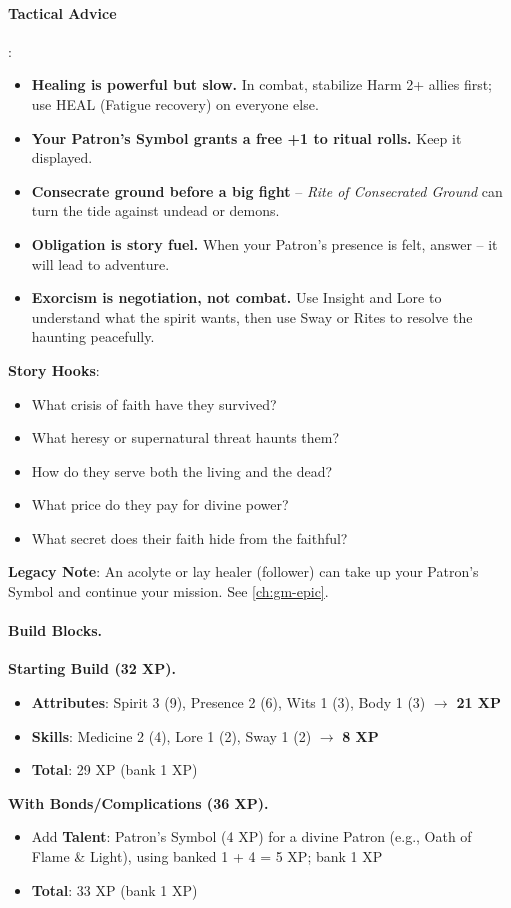 \paragraph{Tactical Advice}:
\begin{itemize}
\item \textbf{Healing is powerful but slow.} In combat, stabilize Harm 2+ allies first; use HEAL (Fatigue recovery) on everyone else.
\item \textbf{Your Patron's Symbol grants a free +1 to ritual rolls.} Keep it displayed.
\item \textbf{Consecrate ground before a big fight} -- \emph{Rite of Consecrated Ground} can turn the tide against undead or demons.
\item \textbf{Obligation is story fuel.} When your Patron's presence is felt, answer -- it will lead to adventure.
\item \textbf{Exorcism is negotiation, not combat.} Use Insight and Lore to understand what the spirit wants, then use Sway or Rites to resolve the haunting peacefully.
\end{itemize}

\textbf{Story Hooks}:
\begin{itemize}
\item What crisis of faith have they survived?
\item What heresy or supernatural threat haunts them?
\item How do they serve both the living and the dead?
\item What price do they pay for divine power?
\item What secret does their faith hide from the faithful?
\end{itemize}

\textbf{Legacy Note}: An acolyte or lay healer (follower) can take up your Patron's Symbol and continue your mission. See \ref{ch:gm-epic}.

\paragraph{Build Blocks.}
\textbf{Starting Build (32 XP).}
\begin{itemize}
\item \textbf{Attributes}: Spirit 3 (9), Presence 2 (6), Wits 1 (3), Body 1 (3) \(\rightarrow\) \textbf{21 XP}
\item \textbf{Skills}: Medicine 2 (4), Lore 1 (2), Sway 1 (2) \(\rightarrow\) \textbf{8 XP}
\item \textbf{Total}: 29 XP (bank 1 XP)
\end{itemize}
\textbf{With Bonds/Complications (36 XP).}
\begin{itemize}
\item Add \textbf{Talent}: Patron's Symbol (4 XP) for a divine Patron (e.g., Oath of Flame \& Light), using banked 1 + 4 = 5 XP; bank 1 XP
\item \textbf{Total}: 33 XP (bank 1 XP)
\end{itemize}

